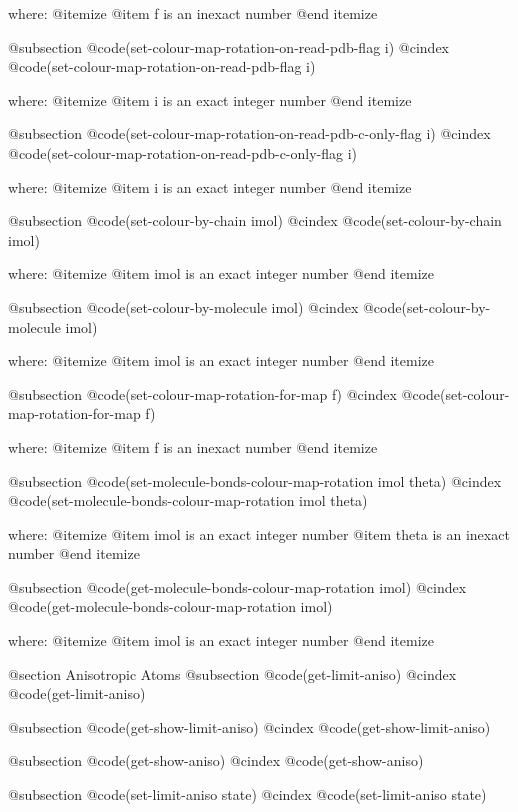 where: 
 @itemize 
     @item f is an inexact number
 @end itemize


@subsection @code{(set-colour-map-rotation-on-read-pdb-flag i)}
@cindex @code{(set-colour-map-rotation-on-read-pdb-flag i)}
 
where: 
 @itemize 
     @item i is an exact integer number
 @end itemize


@subsection @code{(set-colour-map-rotation-on-read-pdb-c-only-flag i)}
@cindex @code{(set-colour-map-rotation-on-read-pdb-c-only-flag i)}
 
where: 
 @itemize 
     @item i is an exact integer number
 @end itemize


@subsection @code{(set-colour-by-chain imol)}
@cindex @code{(set-colour-by-chain imol)}
 
where: 
 @itemize 
     @item imol is an exact integer number
 @end itemize


@subsection @code{(set-colour-by-molecule imol)}
@cindex @code{(set-colour-by-molecule imol)}
 
where: 
 @itemize 
     @item imol is an exact integer number
 @end itemize


@subsection @code{(set-colour-map-rotation-for-map f)}
@cindex @code{(set-colour-map-rotation-for-map f)}
 
where: 
 @itemize 
     @item f is an inexact number
 @end itemize


@subsection @code{(set-molecule-bonds-colour-map-rotation imol theta)}
@cindex @code{(set-molecule-bonds-colour-map-rotation imol theta)}
 
where: 
 @itemize 
     @item imol is an exact integer number
     @item theta is an inexact number
 @end itemize


@subsection @code{(get-molecule-bonds-colour-map-rotation imol)}
@cindex @code{(get-molecule-bonds-colour-map-rotation imol)}
 
where: 
 @itemize 
     @item imol is an exact integer number
 @end itemize



@section Anisotropic Atoms 
@subsection @code{(get-limit-aniso)}
@cindex @code{(get-limit-aniso)}
 
@subsection @code{(get-show-limit-aniso)}
@cindex @code{(get-show-limit-aniso)}
 
@subsection @code{(get-show-aniso)}
@cindex @code{(get-show-aniso)}
 
@subsection @code{(set-limit-aniso state)}
@cindex @code{(set-limit-aniso state)}
 
